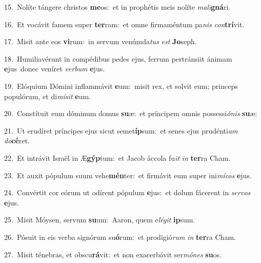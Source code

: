 {\numbfont\textcolor{\numbcolor}{15.}}~Nolíte tángere christos \textbf{me}\-os:~\star et in prophétis meis nolíte \textit{ma}\-\textit{li}\textbf{gná}ri.\par
{\numbfont\textcolor{\numbcolor}{16.}}~Et vocávit famem super \textbf{ter}\-ram:~\star et omne firmaméntum pa\textit{nis} \textit{con}\-\textbf{trí}vit.\par
{\numbfont\textcolor{\numbcolor}{17.}}~Misit ante eos \textbf{vi}\-rum:~\star in servum venúmda\textit{tus} \textit{est} \textbf{Jo}\-seph.\par
{\numbfont\textcolor{\numbcolor}{18.}}~Humiliavérunt in compédibus pedes ejus, ferrum pertránsiit ánimam \textbf{e}\-jus~\star donec veníret \textit{ver}\-\textit{bum} \textbf{e}\-jus.\par
{\numbfont\textcolor{\numbcolor}{19.}}~Elóquium Dómini inflammávit \textbf{e}\-um:~\star misit rex, et solvit eum; princeps populórum, et di\-\textit{mí}\-\textit{sit} \textbf{e}\-um.\par
{\numbfont\textcolor{\numbcolor}{20.}}~Constítuit eum dóminum domus \textbf{su}\-æ:~\star et príncipem omnis possessi\-\textit{ó}\-\textit{nis} \textbf{su}\-æ:\par
{\numbfont\textcolor{\numbcolor}{21.}}~Ut erudíret príncipes ejus sicut semet\-\textbf{íp}\-sum:~\star et senes ejus prudénti\textit{am} \textit{do}\-\textbf{cé}ret.\par
{\numbfont\textcolor{\numbcolor}{22.}}~Et intrávit Israël in Æ\-\textbf{gýp}\-tum:~\star et Jacob áccola fu\textit{it} \textit{in} \textbf{ter}\-ra Cham.\par
{\numbfont\textcolor{\numbcolor}{23.}}~Et auxit pópulum suum vehe\-\textbf{mén}\-ter:~\star et firmávit eum super ini\-\textit{mí}\-\textit{cos} \textbf{e}\-jus.\par
{\numbfont\textcolor{\numbcolor}{24.}}~Convértit cor eórum ut odírent pópulum \textbf{e}\-jus:~\star et dolum fácerent in \textit{ser}\-\textit{vos} \textbf{e}\-jus.\par
{\numbfont\textcolor{\numbcolor}{25.}}~Misit Móysen, servum \textbf{su}\-um:~\star Aaron, quem e\-\textit{lé}\-\textit{git} \textbf{ip}\-sum.\par
{\numbfont\textcolor{\numbcolor}{26.}}~Pósuit in eis verba signórum su\-\textbf{ó}\-rum:~\star et prodigió\textit{rum} \textit{in} \textbf{ter}\-ra Cham.\par
{\numbfont\textcolor{\numbcolor}{27.}}~Misit ténebras, et obscu\-\textbf{rá}\-vit:~\star et non exacerbávit ser\-\textit{mó}\-\textit{nes} \textbf{su}\-os.\par
